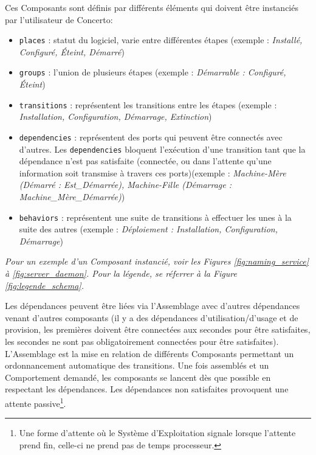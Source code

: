 \documentclass{article}
\newcommand{\concerto}{Concerto\xspace}
\begin{document}
Ces Composants sont définis par différents éléments qui doivent être instanciés
par l'utilisateur de \concerto :
\begin{itemize}
	\item \texttt{places} : statut du logiciel, varie entre différentes étapes
	(exemple : \emph{Installé, Configuré, Éteint, Démarré})

	\item \texttt{groups} : l'union de plusieurs étapes (exemple : \emph{
	Démarrable : Configuré, Éteint})

	\item \texttt{transitions} : représentent les transitions entre les étapes
	(exemple : \emph{Installation, Configuration, Démarrage, Extinction})

	\item \texttt{dependencies} : représentent des \og ports \fg qui peuvent être
	connectés avec d'autres. Les \texttt{dependencies} bloquent l'exécution d'une
	transition tant que la dépendance n'est pas satisfaite (connectée, ou dans
	l'attente qu'une information soit transmise à travers ces ports)(exemple :
	\emph{Machine-Mère (Démarré : Est\_Démarrée), Machine-Fille (Démarrage :
	Machine\_Mère\_Démarrée)})

	\item \texttt{behaviors} : représentent une suite de transitions à effectuer
	les unes à la suite des autres (exemple : \emph{Déploiement : Installation,
	Configuration, Démarrage})

\end{itemize}

\emph{Pour un exemple d'un Composant instancié, voir les Figures
\ref{fig:naming_service} à \ref{fig:server_daemon}. Pour la légende, se réferrer
à la Figure \ref{fig:legende_schema}.}

Les dépendances peuvent être liées via l'\og Assemblage \fg avec d'autres
dépendances venant d'autres composants (il y a des dépendances
d'utilisation/d'usage et de provision, les premières doivent être connectées aux
secondes pour être satisfaites, les secondes ne sont pas obligatoirement
connectées pour être satisfaites). L'\og Assemblage \fg est la mise en relation
de différents Composants permettant un ordonnancement automatique des
transitions. Une fois assemblés et un \og Comportement \fg demandé, les
composants se lancent dès que possible en respectant les dépendances. Les
dépendances non satisfaites provoquent une attente passive\footnote{Une forme
d'attente où le Système d'Exploitation signale lorsque l'attente prend fin,
celle-ci ne prend pas de temps processeur.}.
\end{document}
